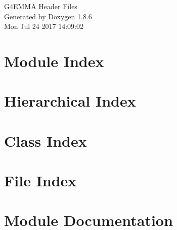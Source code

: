\documentclass[twoside]{book}
\newcommand{\clearemptydoublepage}{%
  \newpage{\pagestyle{empty}\cleardoublepage}%
}
\begin{document}
\hypersetup{pageanchor=false}
\begin{titlepage}
\vspace*{7cm}
\begin{center}%
{\Large G4\-E\-M\-M\-A Header Files }\\
\vspace*{1cm}
{\large Generated by Doxygen 1.8.6}\\
\vspace*{0.5cm}
{\small Mon Jul 24 2017 14:09:02}\\
\end{center}
\end{titlepage}
\clearemptydoublepage
\tableofcontents
\clearemptydoublepage
{}
\hypersetup{pageanchor=true}

\chapter{Module Index}

\chapter{Hierarchical Index}

\chapter{Class Index}

\chapter{File Index}

\chapter{Module Documentation}








\end{document}
